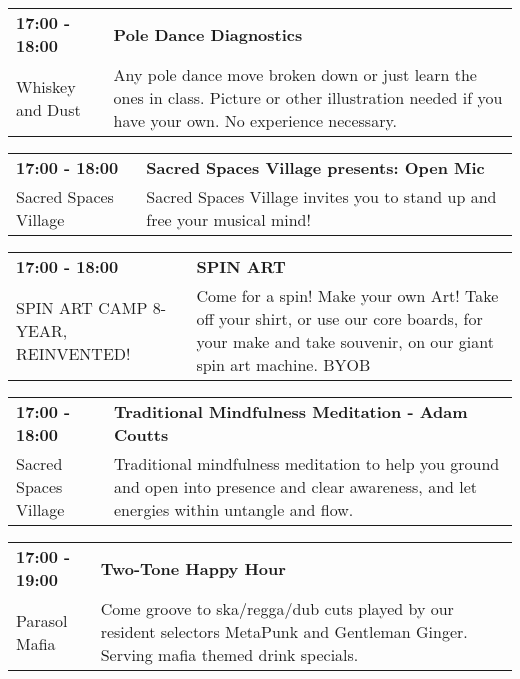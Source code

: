 \begin{tabular}{ p{1in} p{2.2in} }
    \textbf{17:00 - 18:00} & \textbf{Pole Dance Diagnostics} \\
    Whiskey and Dust \newline  & Any pole dance move broken down or just learn the ones in class. Picture or other illustration needed if you have your own. No experience necessary. \\
    \hline 
\end{tabular}
    
\begin{tabular}{ p{1in} p{2.2in} }
    \textbf{17:00 - 18:00} & \textbf{Sacred Spaces Village presents: Open Mic} \\
    Sacred Spaces Village \newline  & Sacred Spaces Village invites you to stand up and free your musical mind! \\
    \hline 
\end{tabular}
    
\begin{tabular}{ p{1in} p{2.2in} }
    \textbf{17:00 - 18:00} & \textbf{SPIN ART} \\
    SPIN ART CAMP 8-YEAR, REINVENTED! \newline  & Come for a spin! Make your own Art! Take off your shirt, or use our core boards, for your make and take souvenir, on our giant spin art machine. BYOB \\
    \hline 
\end{tabular}
    
\begin{tabular}{ p{1in} p{2.2in} }
    \textbf{17:00 - 18:00} & \textbf{Traditional Mindfulness Meditation - Adam Coutts} \\
    Sacred Spaces Village \newline  & Traditional mindfulness meditation to help you ground and open into presence and clear awareness, and let energies within untangle and flow. \\
    \hline 
\end{tabular}
    
\begin{tabular}{ p{1in} p{2.2in} }
    \textbf{17:00 - 19:00} & \textbf{Two-Tone Happy Hour} \\
    Parasol Mafia \newline  & Come groove to ska/regga/dub cuts played by our resident selectors MetaPunk and Gentleman Ginger. Serving mafia themed drink specials. \\
    \hline 
\end{tabular}
    
